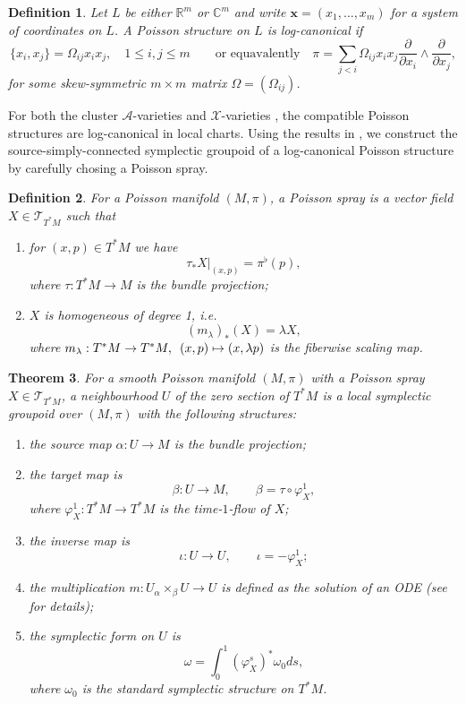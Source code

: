 \documentclass{amsart}
\newtheorem{theorem}{Theorem}[section]
\newtheorem{definition}[theorem]{Definition}
\numberwithin{equation}{section}
\newcommand{\bfx}{\mathbf{x}}
\newcommand{\cA}{\mathcal{A}}
\newcommand{\cX}{\mathcal{X}}
\newcommand{\cT}{\mathcal{T}}
\newcommand{\CC}{\mathbb{C}}
\newcommand{\RR}{\mathbb{R}}
\begin{document}
\begin{definition}
  Let $L$ be either $\RR^m$ or $\CC^m$ and write $\bfx = (x_1, \ldots, x_m)$ for a system of coordinates on $L$.
  A Poisson structure on $L$ is \emph{log-canonical} if
  $$
    \{x_i, x_j\} = \Omega_{ij} x_ix_j, \quad 1 \leq i,j \leq m \qquad \text{or equavalently} \quad
    \pi = \sum_{j < i} \Omega_{ij} x_ix_j\frac{\partial}{\partial x_i} \wedge \frac{\partial}{\partial x_j},
  $$
  for some skew-symmetric $m\times m$ matrix $\Omega = (\Omega_{ij})$.
\end{definition}

For both the cluster $\cA$-varieties \cite{MR2683456} and $\cX$-varieties \cite{MR2470108}, the compatible Poisson structures are log-canonical in local charts.
Using the results in \cite{MR2900786, CMS17}, we construct the source-simply-connected symplectic groupoid of a log-canonical Poisson structure by carefully chosing a Poisson spray. 
\begin{definition} 
  \cite{MR2900786}
  For a Poisson manifold $(M, \pi)$, a \emph{Poisson spray} is a vector field $X \in \cT_{T^*M}$ such that
  \begin{enumerate}
    \item for $(x,p) \in T^*M$ we have
      \[\tau_* X|_{(x,p)} = \pi^\flat(p),\]
      where $\tau: T^*M \to M$ is the bundle projection;
    \item $X$ is homogeneous of degree 1, i.e.
      \[(m_\lambda)_*(X) = \lambda X,\]
      where $m_\lambda: T^*M \to T^*M, \enskip (x,p) \mapsto (x,\lambda p)$ is the fiberwise scaling map.
  \end{enumerate}
\end{definition}

\begin{theorem} 
  \cite{MR2900786, CMS17} 
  \label{thm:poissp}
  For a smooth Poisson manifold $(M, \pi)$ with a Poisson spray $X \in \cT_{T^*M}$, a neighbourhood $U$ of the zero section of $T^*M$ is a local symplectic groupoid over $(M, \pi)$ with the following structures:
  \begin{enumerate}
    \item the source map $\alpha: U \to M$ is the bundle projection;
    \item the target map is
      \[\beta: U \to M, \qquad \beta = \tau \circ \varphi_X^1,\]
      where $\varphi_X^1: T^*M \to T^*M$ is the time-$1$-flow of $X$;
    \item the inverse map is
      \[\iota: U \to U, \qquad \iota = -\varphi_X^1;\]
    \item the multiplication $m: U {_\alpha \times_\beta} U \to U$ is defined as the solution of an ODE (see \cite{CMS17} for details);
    \item the symplectic form on $U$ is
      \[\omega = \int_{0}^{1} (\varphi_X^s)^*\omega_0 ds,\]
      where $\omega_0$ is the standard symplectic structure on $T^*M$.
  \end{enumerate}
\end{theorem}
\end{document}
